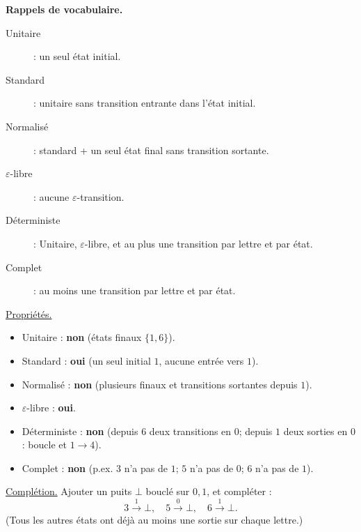 \begin{corrections}

  \textbf{Rappels de vocabulaire.}
  \begin{description}
  \item[Unitaire] : un seul état initial.
  \item[Standard] : unitaire sans transition entrante dans l'état initial.
  \item[Normalisé] : standard + un seul état final sans transition sortante.
  \item[$\varepsilon$-libre] : aucune $\varepsilon$-transition.
  \item[Déterministe] : Unitaire, $\varepsilon$-libre, et au plus une transition par lettre et par état.
  \item[Complet] : au moins une transition par lettre et par état.
  \end{description}
  
  \begin{questions}
  \item 

    \underline{Propriétés.}
    \begin{itemize}
    \item Unitaire : \textbf{non} (états finaux $\{1,6\}$).
    \item Standard : \textbf{oui} (un seul initial $1$, aucune entrée vers $1$).
    \item Normalisé : \textbf{non} (plusieurs finaux et transitions sortantes depuis $1$).
    \item $\varepsilon$-libre : \textbf{oui}.
    \item Déterministe : \textbf{non} (depuis $6$ deux transitions en $0$; depuis $1$ deux sorties en $0$ : boucle et $1\to4$).
    \item Complet : \textbf{non} (p.ex. $3$ n’a pas de $1$; $5$ n’a pas de $0$; $6$ n’a pas de $1$).
    \end{itemize}

    \underline{Complétion.}
    Ajouter un puits $\bot$ bouclé sur $0,1$, et compléter :
    \[
    3 \xrightarrow{1} \bot,\quad
    5 \xrightarrow{0} \bot,\quad
    6 \xrightarrow{1} \bot.
    \]
    (Tous les autres états ont déjà au moins une sortie sur chaque lettre.)


\end{questions}
\end{corrections}
